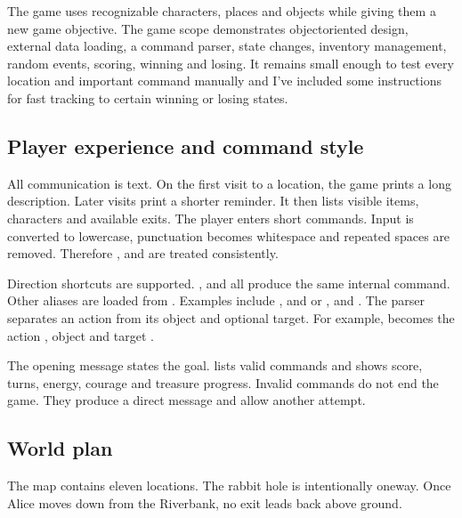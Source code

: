 \documentclass[letterpaper,10pt,english]{sphinxmanual}
\begin{document}
\sphinxAtStartPar
The game uses recognizable characters, places and objects while giving them a new game objective.
The game scope demonstrates object\sphinxhyphen{}oriented design, external data
loading, a command parser, state changes, inventory management, random events,
scoring, winning and losing. It remains small enough to test every location and
important command manually and I’ve included some instructions for fast tracking to
certain winning or losing states.


\subsection{Player experience and command style}
\label{\detokenize{AssignmentFour/main:player-experience-and-command-style}}
\sphinxAtStartPar
All communication is text. On the first visit to a location, the game prints a
long description. Later visits print a shorter reminder. It then lists visible
items, characters and available exits. The player enters short commands. Input
is converted to lowercase, punctuation becomes whitespace and repeated spaces
are removed. Therefore ,  and  are treated
consistently.

\sphinxAtStartPar
Direction shortcuts are supported. ,  and  all
produce the same internal command. Other aliases are loaded from
. Examples include ,  and  or
,  and . The parser separates an action from its
object and optional target. For example,  becomes the
action , object  and target .

\sphinxAtStartPar
The opening message states the goal.  lists valid commands and 
shows score, turns, energy, courage and treasure progress. Invalid commands do
not end the game. They produce a direct message and allow another attempt.


\subsection{World plan}
\label{\detokenize{AssignmentFour/main:world-plan}}
\sphinxAtStartPar
The map contains eleven locations. The rabbit hole is intentionally one\sphinxhyphen{}way.
Once Alice moves down from the Riverbank, no exit leads back above ground.
\end{document}
